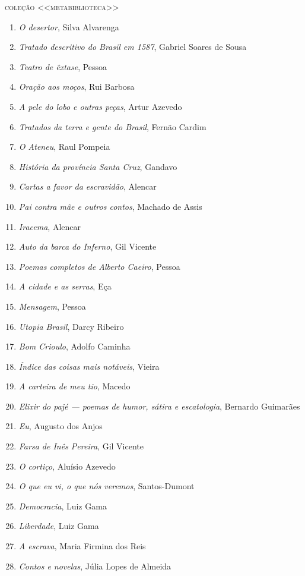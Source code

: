 \medskip
{\large\textsc{coleção <<metabiblioteca>>}}\\

\begin{enumerate}
\setlength\parskip{4.2pt}
\setlength\itemsep{-1.4mm}
\item \textit{O desertor}, Silva Alvarenga
\item \textit{Tratado descritivo do Brasil em 1587}, Gabriel Soares de Sousa
\item \textit{Teatro de êxtase}, Pessoa
\item \textit{Oração aos moços}, Rui Barbosa
\item \textit{A pele do lobo e outras peças}, Artur Azevedo
\item \textit{Tratados da terra e gente do Brasil}, Fernão Cardim 
\item \textit{O Ateneu}, Raul Pompeia
\item \textit{História da província Santa Cruz}, Gandavo
\item \textit{Cartas a favor da escravidão}, Alencar
\item \textit{Pai contra mãe e outros contos}, Machado de Assis
\item \textit{Iracema}, Alencar
\item \textit{Auto da barca do Inferno}, Gil Vicente
\item \textit{Poemas completos de Alberto Caeiro}, Pessoa
\item \textit{A cidade e as serras}, Eça
\item \textit{Mensagem}, Pessoa
\item \textit{Utopia Brasil}, Darcy Ribeiro
\item \textit{Bom Crioulo}, Adolfo Caminha
\item \textit{Índice das coisas mais notáveis}, Vieira
\item \textit{A carteira de meu tio}, Macedo
\item \textit{Elixir do pajé --- poemas de humor, sátira e escatologia}, Bernardo Guimarães
\item \textit{Eu}, Augusto dos Anjos
\item \textit{Farsa de Inês Pereira}, Gil Vicente
\item \textit{O cortiço}, Aluísio Azevedo
\item \textit{O que eu vi, o que nós veremos}, Santos-Dumont
\item \textit{Democracia}, Luiz Gama
\item \textit{Liberdade}, Luiz Gama
\item \textit{A escrava}, Maria Firmina dos Reis
\item \textit{Contos e novelas}, Júlia Lopes de Almeida
\end{enumerate}

